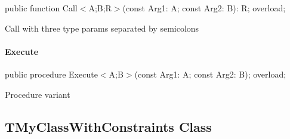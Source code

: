 \documentclass{report}
\newif\ifpdf
\begin{document}
\label{ok_generic_multiple_constraints.TMyClass-Call}
\begin{list}{}{
\setlength{\itemindent}{0cm}
\setlength{\listparindent}{0cm}
\setlength{\leftmargin}{\evensidemargin}
\addtolength{\leftmargin}{\tmplength}
\settowidth{\labelsep}{X}
\addtolength{\leftmargin}{\labelsep}
\setlength{\labelwidth}{\tmplength}
}
\item[\textbf{Declaration}\hfill]
\ifpdf
\begin{flushleft}
\fi
\begin{ttfamily}
public function Call{$<$}A;B;R{$>$}(const Arg1: A; const Arg2: B): R; overload;\end{ttfamily}

\ifpdf
\end{flushleft}
\fi

\par
\item[\textbf{Description}]
Call with three type params separated by semicolons

\end{list}
\paragraph*{Execute}\hspace*{\fill}

\label{ok_generic_multiple_constraints.TMyClass-Execute}
\begin{list}{}{
\setlength{\itemindent}{0cm}
\setlength{\listparindent}{0cm}
\setlength{\leftmargin}{\evensidemargin}
\addtolength{\leftmargin}{\tmplength}
\settowidth{\labelsep}{X}
\addtolength{\leftmargin}{\labelsep}
\setlength{\labelwidth}{\tmplength}
}
\item[\textbf{Declaration}\hfill]
\ifpdf
\begin{flushleft}
\fi
\begin{ttfamily}
public procedure Execute{$<$}A;B{$>$}(const Arg1: A; const Arg2: B); overload;\end{ttfamily}

\ifpdf
\end{flushleft}
\fi

\par
\item[\textbf{Description}]
Procedure variant

\end{list}
\ifpdf
\subsection*{\large{\textbf{TMyClassWithConstraints Class}}\normalsize\hspace{1ex}\hrulefill}
\else
\end{document}
